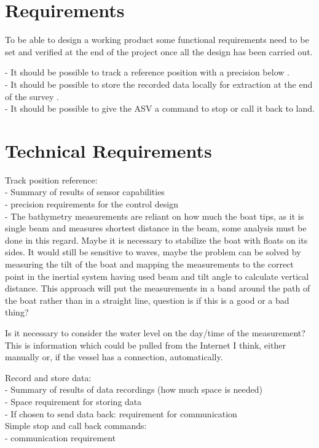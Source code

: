 \section{Requirements} \label{sec:requirements}
To be able to design a working product some functional requirements need to be set and verified at the end of the project once all the design has been carried out.

- It should be possible to track a reference position with a precision below .\\
- It should be possible to store the recorded data locally for extraction at the end of the survey .\\
- It should be possible to give the ASV a command to stop or call it back to land.

\section{Technical Requirements}
Track position reference:\\
- Summary of results of sensor capabilities\\
- precision requirements for the control design\\
- The bathymetry measurements are reliant on how much the boat tips, as it is single beam and measures shortest distance in the beam, some analysis must be done in this regard. Maybe it is necessary to stabilize the boat with floats on its sides. It would still be sensitive to waves, maybe the problem can be solved by measuring the tilt of the boat and mapping the measurements to the correct point in the inertial system having used beam and tilt angle to calculate vertical distance. This approach will put the measurements in a band around the path of the boat rather than in a straight line, question is if this is a good or a bad thing?

Is it necessary to consider the water level on the day/time of the measurement? This is information which could be pulled from the Internet I think, either manually or, if the vessel has a connection, automatically.

Record and store data:\\
- Summary of results of data recordings (how much space is needed)\\
- Space requirement for storing data\\
- If chosen to send data back: requirement for communication\\

Simple stop and call back commands:\\
- communication requirement



